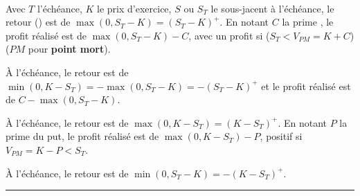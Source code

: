 \begin{f}

\ %


Avec $T$ l'échéance, $K$ le prix d'exercice, $S$ ou $S_T$ le sous-jacent à l'échéance, le retour () est de $\max (0, S_T-K)=( S_T-K)^{+}$.
En notant $C$ la prime , le profit réalisé est de $\max (0, S_T-K)-C$, avec un profit si  ($S_T<V_{PM}=K + C$)  ($PM$ pour \textbf{point mort}).

		


\medskip



À l'échéance, le retour est de $\min (0,K- S_T)=-\max(0, S_T-K)=-( S_T-K)^{+}$ et le profit réalisé est de $C-\max (0, S_T-K)$.

\medskip

		
\medskip



À l'échéance, le retour est de $\max (0,K- S_T)=(K- S_T)^{+}$.
En notant $P$ la prime du put, le profit réalisé est de $\max (0,K- S_T)-P$, positif si$V_{PM}=K -P<S_T$.

\medskip

	    	     


\medskip

	    	     

À l'échéance, le retour est de $\min (0, S_T-K)=-(K- S_T)^+$.


\end{f}
\hrule

